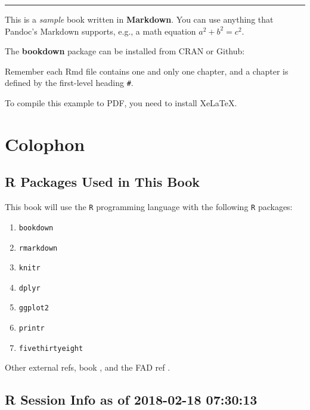 \documentclass[]{book}
\providecommand{\tightlist}{%
  \setlength{\itemsep}{0pt}\setlength{\parskip}{0pt}}
\theoremstyle{definition}
\theoremstyle{definition}
\theoremstyle{definition}
\theoremstyle{remark}
\begin{document}
\begin{center}\rule{0.5\linewidth}{\linethickness}\end{center}

This is a \emph{sample} book written in \textbf{Markdown}. You can use
anything that Pandoc's Markdown supports, e.g., a math equation
\(a^2 + b^2 = c^2\).

The \textbf{bookdown} package can be installed from CRAN or Github:

Remember each Rmd file contains one and only one chapter, and a chapter
is defined by the first-level heading \texttt{\#}.

To compile this example to PDF, you need to install XeLaTeX.

\section*{Colophon}\label{colophon}

\subsection*{R Packages Used in This
Book}\label{r-packages-used-in-this-book}

This book will use the \texttt{R} programming language \citep{R-base}
with the following \texttt{R} packages:

\begin{enumerate}
\def\labelenumi{\arabic{enumi}.}
\tightlist
\item
  \texttt{bookdown} \citep{R-bookdown}
\item
  \texttt{rmarkdown} \citep{R-rmarkdown}
\item
  \texttt{knitr} \citep{R-knitr}
\item
  \texttt{dplyr} \citep{R-dplyr}
\item
  \texttt{ggplot2} \citep{R-ggplot2}
\item
  \texttt{printr} \citep{R-printr}
\item
  \texttt{fivethirtyeight} \citep{R-fivethirtyeight}
\end{enumerate}

Other external refs, book \citep{xie2015}, and the FAD ref
\citep{Miller_Epstein_Bishop_Keitner_1985}.

\subsection*{R Session Info as of 2018-02-18
07:30:13}\label{r-session-info-as-of-2018-02-18-073013}
\end{document}
